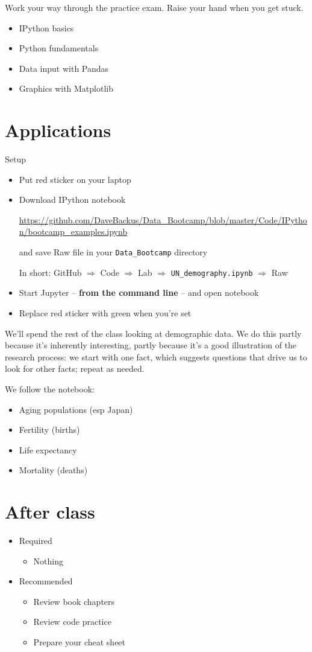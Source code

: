 \documentclass[11pt]{article}
\begin{document}
Work your way through the practice exam.  Raise your hand when you get stuck.
\begin{itemize}
\item IPython basics
\item Python fundamentals
\item Data input with Pandas
\item Graphics with Matplotlib
\end{itemize}


\section*{Applications}

{Setup}
\begin{itemize}
\item Put red sticker on your laptop

\item Download IPython notebook

\url{https://github.com/DaveBackus/Data_Bootcamp/blob/master/Code/IPython/bootcamp_examples.ipynb} %

and save Raw file in your \verb|Data_Bootcamp| directory

In short:  GitHub $\Rightarrow$ Code $\Rightarrow$ Lab $\Rightarrow$ \verb|UN_demography.ipynb|
$\Rightarrow$ Raw

\item Start Jupyter -- {\bf from the command line} -- and open notebook
\item Replace red sticker with green when you're set
\end{itemize}

We'll spend the rest of the class looking at demographic data.
We do this partly because it's inherently interesting, 
partly because it's a good illustration of the research process:
we start with one fact, which suggests questions
that drive us to look for other facts; repeat as needed.  

We follow the notebook:  
\begin{itemize}
\item Aging populations (esp Japan) 
\item Fertility (births)
\item Life expectancy 
\item Mortality (deaths) 
\end{itemize}


\section*{After class}

\begin{itemize}
\item Required
\begin{itemize}
\item Nothing
\end{itemize}
\item Recommended
\begin{itemize}
\item Review book chapters
\item Review code practice
\item Prepare your cheat sheet
\end{itemize}
\end{itemize}


\end{document}

